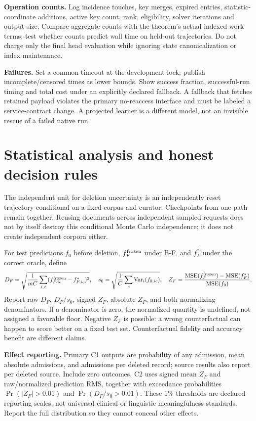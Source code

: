 \documentclass[11pt,a4paper]{article}
\begin{document}
\textbf{Operation counts.} Log incidence touches, key merges, expired entries, statistic-coordinate additions, active key count, rank, eligibility, solver iterations and output size. Compare aggregate counts with the theorem's actual indexed-work terms; test whether counts predict wall time on held-out trajectories. Do not charge only the final head evaluation while ignoring state canonicalization or index maintenance.

\textbf{Failures.} Set a common timeout at the development lock; publish incomplete/censored times as lower bounds. Show success fraction, successful-run timing and total cost under an explicitly declared fallback. A fallback that fetches retained payload violates the primary no-reaccess interface and must be labeled a service-contract change. A projected learner is a different model, not an invisible rescue of a failed native run.

\section{Statistical analysis and honest decision rules}
The independent unit for deletion uncertainty is an independently reset trajectory conditional on a fixed corpus and curator. Checkpoints from one path remain together. Reusing documents across independent sampled requests does not by itself destroy this conditional Monte Carlo independence; it does not create independent corpora either.

For test predictions $f_0$ before deletion, $f_{F}^{\rm frozen}$ under B-F, and $f_F^*$ under the correct oracle, define
\[
 D_F=\sqrt{\frac1{mC}\sum_{i,c}(f_{F,ic}^{\rm frozen}-f_{F,ic}^*)^2},\quad
 s_0=\sqrt{\frac1C\sum_c\operatorname{Var}_{i}(f_{0,ic})},\quad
 Z_F=\frac{\operatorname{MSE}(f_F^{\rm frozen})-\operatorname{MSE}(f_F^*)}
 {\operatorname{MSE}(f_0)}.
\]
Report raw $D_F$, $D_F/s_0$, signed $Z_F$, absolute $Z_F$, and both normalizing denominators. If a denominator is zero, the normalized quantity is undefined, not assigned a favorable floor. Negative $Z_F$ is possible: a wrong counterfactual can happen to score better on a fixed test set. Counterfactual fidelity and accuracy benefit are different claims.

\textbf{Effect reporting.} Primary C1 outputs are probability of any admission, mean absolute admissions, and admissions per deleted record; source results also report per deleted source. Include zero outcomes. C2 uses signed mean $Z_F$ and raw/normalized prediction RMS, together with exceedance probabilities $\Pr(|Z_F|>0.01)$ and $\Pr(D_F/s_0>0.01)$. These 1\% thresholds are declared reporting scales, not universal clinical or linguistic meaningfulness standards. Report the full distribution so they cannot conceal other effects.
\end{document}
